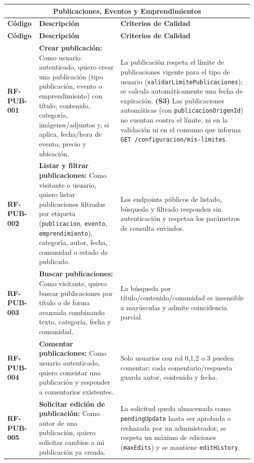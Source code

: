 \begin{longtable}{|l||p{7cm}|p{4.5cm}|}

\multicolumn{3}{c}{Publicaciones, Eventos y Emprendimientos}\\
\hline\hline
\textbf{Código} & \textbf{Descripción} & \textbf{Criterios de Calidad}\\
\hline
\endfirsthead
\textbf{Código} & \textbf{Descripción} & \textbf{Criterios de Calidad}\\
\hline\hline
\endhead

\textbf{RF-PUB-001} & \textbf{Crear publicación:} Como usuario autenticado, quiero crear una publicación (tipo publicación, evento o emprendimiento) con título, contenido, categoría, imágenes/adjuntos y, si aplica, fecha/hora de evento, precio y ubicación. & La publicación respeta el límite de publicaciones vigente para el tipo de usuario (\texttt{validarLimitePublicaciones}); se calcula automáticamente una fecha de expiración. \textbf{(S3)} Las publicaciones automáticas (con \texttt{publicacionOrigenId}) no cuentan contra el límite, ni en la validación ni en el consumo que informa \texttt{GET /configuracion/mis-limites}. \\
\hline
\textbf{RF-PUB-002} & \textbf{Listar y filtrar publicaciones:} Como visitante o usuario, quiero listar publicaciones filtradas por etiqueta (\texttt{publicacion}, \texttt{evento}, \texttt{emprendimiento}), categoría, autor, fecha, comunidad o estado de publicado. & Los endpoints públicos de listado, búsqueda y filtrado responden sin autenticación y respetan los parámetros de consulta enviados. \\
\hline
\textbf{RF-PUB-003} & \textbf{Buscar publicaciones:} Como visitante, quiero buscar publicaciones por título o de forma avanzada combinando texto, categoría, fecha y comunidad. & La búsqueda por título/contenido/comunidad es insensible a mayúsculas y admite coincidencia parcial. \\
\hline
\textbf{RF-PUB-004} & \textbf{Comentar publicaciones:} Como usuario autenticado, quiero comentar una publicación y responder a comentarios existentes. & Solo usuarios con rol 0,1,2 o 3 pueden comentar; cada comentario/respuesta guarda autor, contenido y fecha. \\
\hline
\textbf{RF-PUB-005} & \textbf{Solicitar edición de publicación:} Como autor de una publicación, quiero solicitar cambios a mi publicación ya creada. & La solicitud queda almacenada como \texttt{pendingUpdate} hasta ser aprobada o rechazada por un administrador; se respeta un máximo de ediciones (\texttt{maxEdits}) y se mantiene \texttt{editHistory}. \\

\end{longtable}
